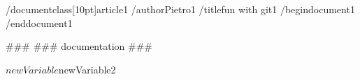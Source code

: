 /documentclass[10pt]{article1}
/author{Pietro1}
/title{fun with git1}
/begin{document1}
/end{document1}

###
### documentation
###



$newVariable
$newVariable2
